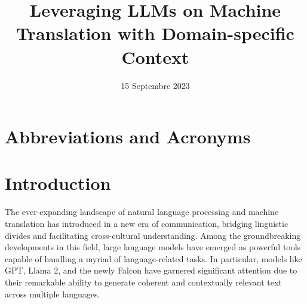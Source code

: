 \documentclass[12pt]{article}
\title{Leveraging LLMs on Machine Translation with Domain-specific Context}
\author{
\AND
\AND
\AND
\AND\AND
\AND
\AND
}
\date{15 Septembre 2023}
\begin{document}
\maketitle

\newpage
\tableofcontents
\thispagestyle{empty}


\newpage
\thispagestyle{empty}

\listoffigures 

\newpage
\listoftables

\newpage
\thispagestyle{empty}

\section*{Abbreviations and Acronyms}
\begin{acronym}[XXXXXXXXXXXXXX]
\end{acronym}






\newpage
\setcounter{page}{1}
\section{Introduction}

The ever-expanding landscape of natural language processing and machine translation has introduced in a new era of communication, bridging linguistic divides and facilitating cross-cultural understanding. Among the groundbreaking developments in this field, large language models have emerged as powerful tools capable of handling a myriad of language-related tasks. In particular, models like GPT, Llama 2, and the newly Falcon have garnered significant attention due to their remarkable ability to generate coherent and contextually relevant text across multiple languages.
\end{document}
